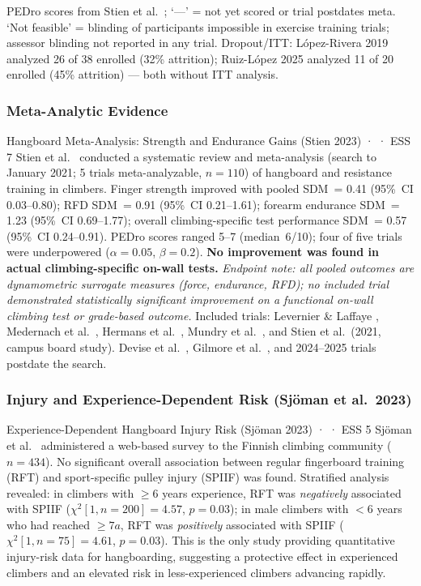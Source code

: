 \noindent\small PEDro scores from Stien et al.\ \cite{SO23}; `---' = not yet scored or trial postdates meta. `Not feasible' = blinding of participants impossible in exercise training trials; assessor blinding not reported in any trial. Dropout/ITT: López-Rivera 2019 analyzed 26 of 38 enrolled (32\% attrition); Ruiz-López 2025 analyzed 11 of 20 enrolled (45\% attrition) — both without ITT analysis.

\subsubsection{Meta-Analytic Evidence}

\begin{evidencebox}{Hangboard Meta-Analysis: Strength and Endurance Gains (Stien 2023) · \evidencebacked · ESS 7}
Stien et al.\ \cite{SO23} conducted a systematic review and meta-analysis (search to January 2021; 5 trials meta-analyzable, $n=110$) of hangboard and resistance training in climbers. Finger strength improved with pooled SDM~= 0.41 (95\%~CI 0.03--0.80); RFD SDM~= 0.91 (95\%~CI 0.21--1.61); forearm endurance SDM~= 1.23 (95\%~CI 0.69--1.77); overall climbing-specific test performance SDM~= 0.57 (95\%~CI 0.24--0.91). PEDro scores ranged 5--7 (median~6/10); four of five trials were underpowered ($\alpha = 0.05$, $\beta = 0.2$). \textbf{No improvement was found in actual climbing-specific on-wall tests.} \textit{Endpoint note: all pooled outcomes are dynamometric surrogate measures (force, endurance, RFD); no included trial demonstrated statistically significant improvement on a functional on-wall climbing test or grade-based outcome.} Included trials: Levernier \& Laffaye \cite{LL19}, Medernach et al.\ \cite{MKL15}, Hermans et al.\ \cite{HO22}, Mundry et al.\ \cite{MSA+21}, and Stien et al.\ (2021, campus board study). Devise et al.\ \cite{DO22}, Gilmore et al.\ \cite{GKAO24}, and 2024--2025 trials postdate the search.
\end{evidencebox}

\subsubsection{Injury and Experience-Dependent Risk (Sjöman et al.\ 2023)}

\begin{evidencebox}{Experience-Dependent Hangboard Injury Risk (Sjöman 2023) · \evidencebacked · ESS 5}
Sjöman et al.\ \cite{SGJ23} administered a web-based survey to the Finnish climbing community ($n=434$). No significant overall association between regular fingerboard training (RFT) and sport-specific pulley injury (SPIIF) was found. Stratified analysis revealed: in climbers with $\geq6$ years experience, RFT was \emph{negatively} associated with SPIIF ($\chi^2[1, n=200]=4.57$, $p=0.03$); in male climbers with $<6$ years who had reached $\geq7a$, RFT was \emph{positively} associated with SPIIF ($\chi^2[1, n=75]=4.61$, $p=0.03$). This is the only study providing quantitative injury-risk data for hangboarding, suggesting a protective effect in experienced climbers and an elevated risk in less-experienced climbers advancing rapidly.
\end{evidencebox}

